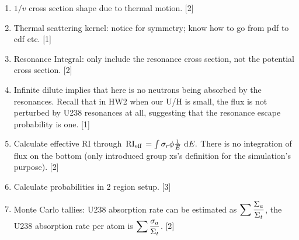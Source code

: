 \documentclass{school-22.211-notes}
\begin{document}
\begin{enumerate}
\item $1/v$ cross section shape due to thermal motion. [2]
\item Thermal scattering kernel: notice for symmetry; know how to go from pdf to cdf etc. [1]
\item Resonance Integral: only include the resonance cross section, not the potential cross section. [2]
\item Infinite dilute implies that here is no neutrons being absorbed by the resonances. Recall that in HW2 when our U/H is small, the flux is not perturbed by U238 resonances at all, suggesting that the resonance escape probability is one. [1]
\item Calculate effective RI through $\left. \mathrm{RI}_{\mathrm{eff}} \right. = \int \sigma_r \phi \frac{1}{E} \mbox{ }\mathrm{d} E.$ There is no integration of flux on the bottom (only introduced group xs's definition for the simulation's purpose). [2]
\item Calculate probabilities in 2 region setup. [3]
\item Monte Carlo tallies: U238 absorption rate can be estimated as $\displaystyle\sum \frac{\Sigma_a}{\Sigma_t}$, the U238 absorption rate per atom is $\displaystyle\sum \frac{\sigma_a}{\Sigma_t}$. [2]
\end{enumerate}
\end{document}
